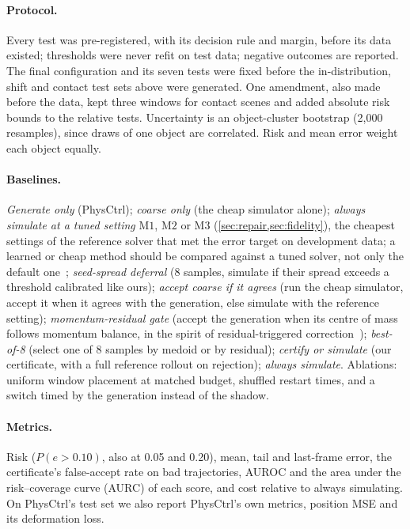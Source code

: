 \paragraph{Protocol.}
Every test was pre-registered, with its decision rule and margin, before its data existed; thresholds were never refit on test data; negative outcomes are reported.
The final configuration and its seven tests were fixed before the in-distribution, shift and contact test sets above were generated. One amendment, also made before the data, kept three windows for contact scenes and added absolute risk bounds to the relative tests.
Uncertainty is an object-cluster bootstrap (2{,}000 resamples), since draws of one object are correlated.
Risk and mean error weight each object equally.

\paragraph{Baselines.}
\emph{Generate only} (PhysCtrl);
\emph{coarse only} (the cheap simulator alone);
\emph{always simulate at a tuned setting} $\mathrm{M1}$, $\mathrm{M2}$ or $\mathrm{M3}$ (\cref{sec:repair,sec:fidelity}), the cheapest settings of the reference solver that met the error target on development data; a learned or cheap method should be compared against a tuned solver, not only the default one~\cite{mcgreivy2024weak};
\emph{seed-spread deferral} (8 samples, simulate if their spread exceeds a threshold calibrated like ours);
\emph{accept coarse if it agrees} (run the cheap simulator, accept it when it agrees with the generation, else simulate with the reference setting);
\emph{momentum-residual gate} (accept the generation when its centre of mass follows momentum balance, in the spirit of residual-triggered correction~\cite{roy2025anchor});
\emph{best-of-8} (select one of 8 samples by medoid or by residual);
\emph{certify or simulate} (our certificate, with a full reference rollout on rejection);
\emph{always simulate}.
Ablations: uniform window placement at matched budget, shuffled restart times, and a switch timed by the generation instead of the shadow.

\paragraph{Metrics.}
Risk ($P(e > 0.10)$, also at 0.05 and 0.20), mean, tail and last-frame error, the certificate's false-accept rate on bad trajectories, AUROC and the area under the risk--coverage curve (AURC) of each score, and cost relative to always simulating.
On PhysCtrl's test set we also report PhysCtrl's own metrics, position MSE and its deformation loss.
